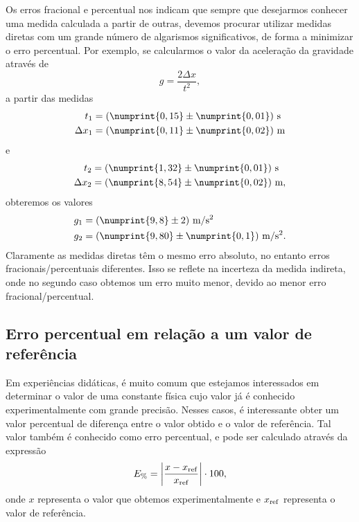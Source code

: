 Os erros fracional e percentual nos indicam que sempre que desejarmos conhecer uma medida calculada a partir de outras, devemos procurar utilizar medidas diretas com um grande número de algarismos significativos, de forma a minimizar o erro percentual. Por exemplo, se calcularmos o valor da aceleração da gravidade através de
\begin{equation}
	g = \frac{2\Delta x}{t^2},
\end{equation}
%
a partir das medidas 
\begin{align}
	t_1 &= (\numprint{0,15} \pm \numprint{0,01})~\textrm{s} \\
	\Delta x_1 &= (\numprint{0,11} \pm \numprint{0,02})~\textrm{m}
\end{align}
%
e
\begin{align}
	t_2 &= (\numprint{1,32} \pm \numprint{0,01})~\textrm{s} \\
	\Delta x_2 &= (\numprint{8,54} \pm \numprint{0,02})~\textrm{m},
\end{align}
%
obteremos os valores
\begin{align}
	g_1 &= (\numprint{9,8} \pm 2)~\textrm{m}/\textrm{s}^2 \\
	g_2 &= (\numprint{9,80} \pm \numprint{0,1})~\textrm{m}/\textrm{s}^2.
\end{align}
%
Claramente as medidas diretas têm o mesmo erro absoluto, no entanto erros fracionais/percentuais diferentes. Isso se reflete na incerteza da medida indireta, onde no segundo caso obtemos um erro muito menor, devido ao menor erro fracional/percentual.

\subsection{Erro percentual em relação a um valor de referência}

Em experiências didáticas, é muito comum que estejamos interessados em determinar o valor de uma constante física cujo valor já é conhecido experimentalmente com grande precisão. Nesses casos, é interessante obter um valor percentual de diferença entre o valor obtido e o valor de referência. Tal valor também é conhecido como erro percentual, e pode ser calculado através da expressão
\begin{equation}
    E_\% = \left|\frac{x - x_{\rm{ref}}}{x_{\rm{ref}}}\right| \cdot 100,
\end{equation}
%
onde $x$ representa o valor que obtemos experimentalmente e $x_{\rm{ref}}$ representa o valor de referência.

